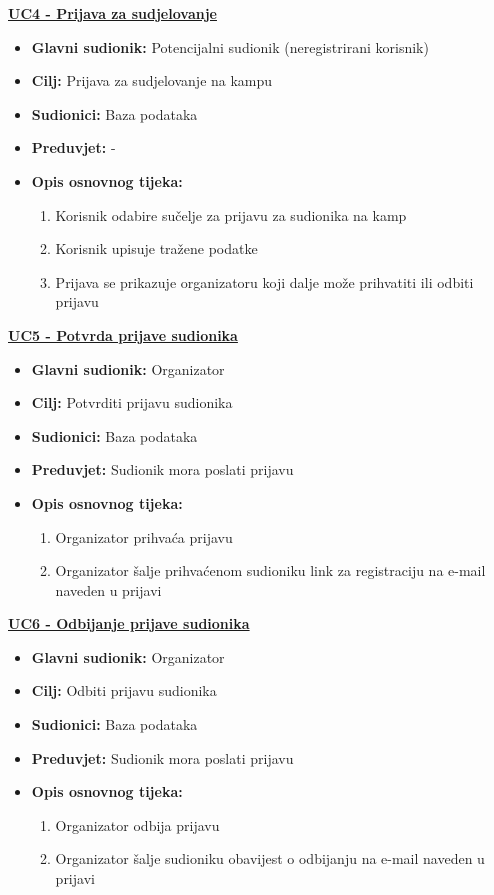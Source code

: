 \noindent \underline{\textbf{UC4 - Prijava za sudjelovanje}}
\begin{itemize}
	\item \textbf{Glavni sudionik:} Potencijalni sudionik (neregistrirani korisnik)
	\item \textbf{Cilj:} Prijava za sudjelovanje na kampu
	\item \textbf{Sudionici:} Baza podataka
	\item \textbf{Preduvjet:} -
	\item \textbf{Opis osnovnog tijeka:} 
	\begin{enumerate}	
		\item Korisnik odabire sučelje za prijavu za sudionika na kamp
		\item Korisnik upisuje tražene podatke
		\item Prijava se prikazuje organizatoru koji dalje može prihvatiti ili odbiti prijavu\\
	\end{enumerate}
\end{itemize}


\noindent \underline{\textbf{UC5 - Potvrda prijave sudionika}}
\begin{itemize}
	\item \textbf{Glavni sudionik:} Organizator
	\item \textbf{Cilj:} Potvrditi prijavu sudionika
	\item \textbf{Sudionici:} Baza podataka
	\item \textbf{Preduvjet:} Sudionik mora poslati prijavu 
	\item \textbf{Opis osnovnog tijeka:} 
	\begin{enumerate}	
		\item Organizator prihvaća prijavu
		\item Organizator šalje prihvaćenom sudioniku link za registraciju na e-mail naveden u prijavi\\
	\end{enumerate}
	
\end{itemize}


\noindent \underline{\textbf{UC6 - Odbijanje prijave sudionika}}
\begin{itemize}
	\item \textbf{Glavni sudionik:} Organizator
	\item \textbf{Cilj:} Odbiti prijavu sudionika
	\item \textbf{Sudionici:} Baza podataka
	\item \textbf{Preduvjet:} Sudionik mora poslati prijavu
	\item \textbf{Opis osnovnog tijeka:} 
	\begin{enumerate}	
		\item Organizator odbija prijavu
		\item Organizator šalje sudioniku obavijest o odbijanju na e-mail naveden u prijavi\\
	\end{enumerate}
	
\end{itemize}



